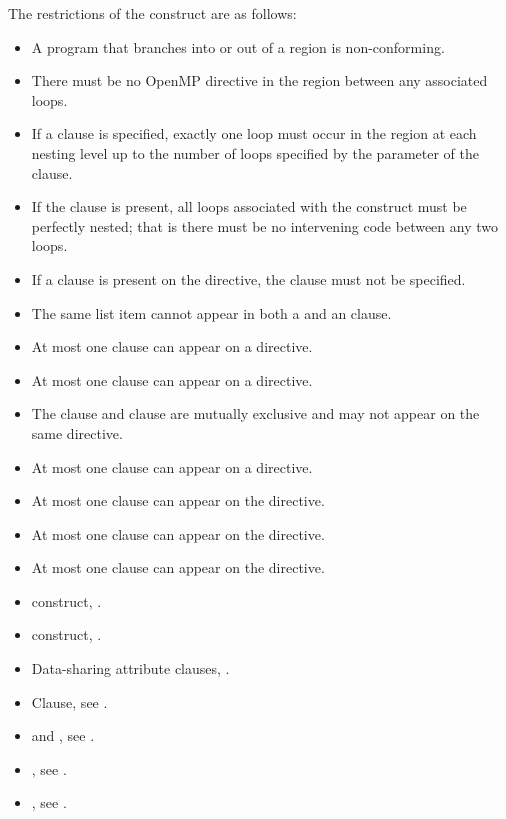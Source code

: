 \restrictions
The restrictions of the  construct are as follows:
\begin{itemize}
\item A program that branches into or out of a  region is non-conforming.

\item There must be no OpenMP directive in the region between any
associated loops.

\item If a  clause is specified, exactly one loop must
occur in the region at each nesting level up to the number of loops
specified by the parameter of the  clause.

\item If the  clause is present, all loops associated
with the construct must be perfectly nested; that is there must be
no intervening code between any two loops.

\item If a  clause is present on the  directive, the  clause must not be specified.
\item The same list item cannot appear in both a  and an  clause.
\item At most one  clause can appear on a  directive.
\item At most one  clause can appear on a  directive.
\item The  clause and  clause are mutually exclusive and may not appear on the same  directive.
\item At most one  clause can appear on a  directive.
\item At most one  clause can appear on the directive.
\item At most one  clause can appear on the directive.
\item At most one  clause can appear on the directive.
\end{itemize}

\crossreferences
\begin{itemize}
\item {} construct, .
\item {} construct, .
\item Data-sharing attribute clauses, .
\item {} Clause, see .
\item {} and , see
  .
\item {}, see .
\item {}, see
.

\end{itemize}






